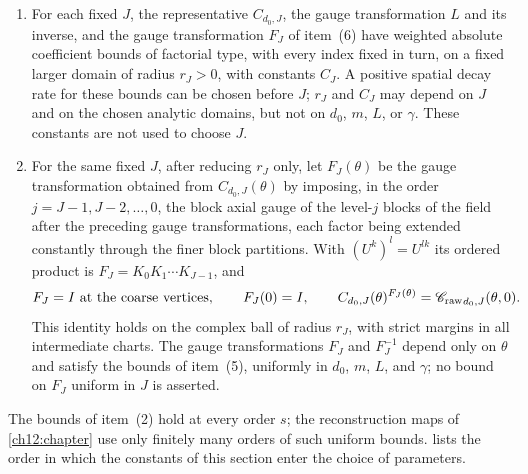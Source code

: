 \begin{lemma}
\begin{enumerate}
\item For each fixed $J$, the representative $C_{d_0,J}$, the gauge transformation $L$ and its inverse, and the gauge transformation $F_J$ of item~(6) have weighted absolute coefficient bounds of factorial type, with every index fixed in turn, on a fixed larger domain of radius $r_J>0$, with constants $C_J$. A positive spatial decay rate for these bounds can be chosen before $J$; $r_J$ and $C_J$ may depend on $J$ and on the chosen analytic domains, but not on $d_0$, $m$, $L$, or $\gamma$. These constants are not used to choose $J$.
\item For the same fixed $J$, after reducing $r_J$ only, let $F_J(\theta)$ be the gauge transformation obtained from $C_{d_0,J}(\theta)$ by imposing, in the order $j=J-1,J-2,\dots,0$, the block axial gauge of the level-$j$ blocks of the field after the preceding gauge transformations, each factor being extended constantly through the finer block partitions. With $(U^k)^l=U^{lk}$ its ordered product is $F_J=K_0K_1\cdots K_{J-1}$, and
\[
 F_J=I\ \text{at the coarse vertices},\qquad F_J(0)=I,\qquad
 C_{d_0,J}(\theta)^{F_J(\theta)}
       ={\mathscr C_{\mathrm{raw}}}_{d_0,J}(\theta,0).
\]
This identity holds on the complex ball of radius $r_J$, with strict margins in all intermediate charts. The gauge transformations $F_J$ and $F_J^{-1}$ depend only on $\theta$ and satisfy the bounds of item~(5), uniformly in $d_0$, $m$, $L$, and $\gamma$; no bound on $F_J$ uniform in $J$ is asserted.
\end{enumerate}
\end{lemma}

The bounds of item~(2) hold at every order $s$; the reconstruction maps of \cref{ch12:chapter} use only finitely many orders of such uniform bounds.  lists the order in which the constants of this section enter the choice of parameters.

